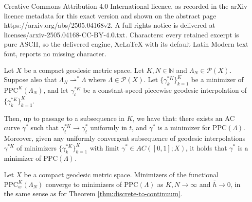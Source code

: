 \documentclass[10pt,a4paper]{amsart}
\begin{document}
Creative Commons Attribution 4.0 International licence, as recorded in the arXiv licence metadata for this exact version and shown on the abstract page https://arxiv.org/abs/2505.04168v2. A full rights notice is delivered at licenses/arxiv-2505.04168-CC-BY-4.0.txt. Characters: every retained excerpt is pure ASCII, so the delivered engine, XeLaTeX with its default Latin Modern text font, reports no missing character.
\begin{theorem}
\label{thm:discrete-to-continuum}
Let $X$ be a compact geodesic metric space. Let $K,N\in\mathbb{N}$ and
$\Lambda_{N}\in\mathcal{P}(X)$. Suppose also that
$\Lambda_{N}\rightharpoonup^{*}\Lambda$ where
$\Lambda\in\mathcal{P}(X)$. Let $\{\gamma_{k}^{*K}\}_{k=1}^{K}$ be a
minimizer of $\text{PPC}^{K}(\Lambda_{N})$, and let $\gamma^{*K}_t$ be a
constant-speed piecewise geodesic interpolation of
$\{\gamma_{k}^{*K}\}_{k=1}^{K}$.

Then, up to passage to a subsequence
in $K$, we have that: there exists an AC curve $\gamma^{*}$ such that
$\gamma_{t}^{*K}\rightarrow\gamma_{t}^{*}$ uniformly in
$t$, and $\gamma^{*}$ is a minimizer for $\text{PPC}(\Lambda)$.
Moreover, given any uniformly convergent subsequence of geodesic interpolations
$\gamma^{*K}$ of minimizers $\{\gamma_{k}^{*K}\}_{k=1}^{K}$ with limit
$\gamma^{*}\in AC([0,1];X)$, it holds that $\gamma^{*}$ is a minimizer
of $\text{PPC}(\Lambda)$.
\end{theorem}

\begin{prop}
\label{prop:discrete-nonlocal-to-continuum}
Let $X$ be a compact geodesic metric space. Minimizers of the functional
$\text{PPC}_{w}^{K}(\Lambda_{N})$ converge to minimizers of $\text{PPC}(\Lambda)$
as $K,N\rightarrow\infty$ and $\bar{h}\rightarrow0$, in the same
sense as for Theorem \ref{thm:discrete-to-continuum}.
\end{prop}
\end{document}
